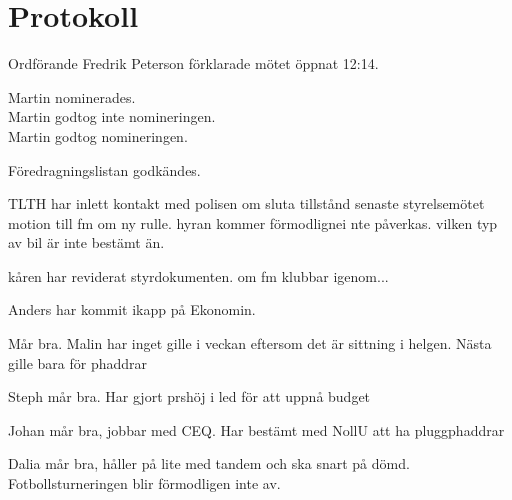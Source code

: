 \documentclass[10pt]{article}
\def\mo{Fredrik Peterson}
\begin{document}
\section*{Protokoll}
\begin{paragrafer}
Ordförande {\mo} förklarade mötet öppnat 12:14.

\valavmo

\valavms

\tosg

\ingaadj

Martin nominerades.\\
Martin godtog inte nomineringen.\\
Martin godtog nomineringen.

\valavj

Föredragningslistan godkändes.

\begin{fyllnadsval} %
\end{fyllnadsval}


\begin{paragrafer}
TLTH har inlett kontakt med polisen om sluta tillstånd
senaste styrelsemötet motion till fm om ny rulle. hyran kommer förmodlignei nte påverkas. vilken typ av bil är inte bestämt än.

kåren har reviderat styrdokumenten. om fm klubbar igenom...

Anders har kommit ikapp på Ekonomin.

Mår bra. Malin har inget gille i veckan eftersom det är sittning i helgen. Nästa gille bara för phaddrar

Steph mår bra. Har gjort prshöj i led för att uppnå budget

Johan mår bra, jobbar med CEQ. Har bestämt med NollU att ha pluggphaddrar

Dalia mår bra, håller på lite med tandem och ska snart på dömd. Fotbollsturneringen blir förmodligen inte av.


\end{paragrafer}
\end{paragrafer}
\end{document}
